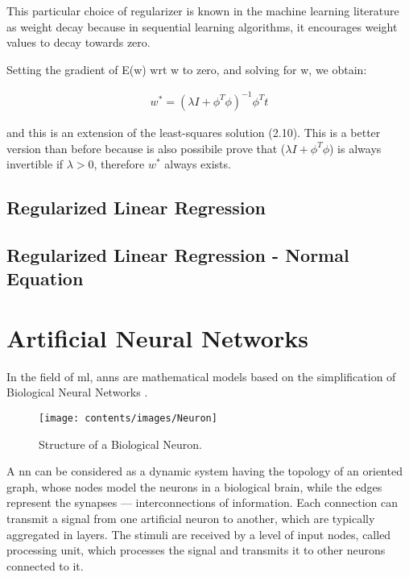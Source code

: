 \noindent This particular choice of regularizer is known in the machine learning literature as
weight decay because in sequential learning algorithms, it encourages weight values
to decay towards zero.

\noindent Setting the gradient of E(w) wrt w to zero, and solving for w, we obtain:

\begin{Equation}[H]
	\centering
		\begin{equation}
			\begin{aligned}
				w^* = (\lambda I + \phi^T \phi)^{-1} \phi^T t
			\end{aligned}
		\end{equation}
	\label{eq:mathmodelaada}
\end{Equation}

\noindent and this is an extension of the least-squares solution (2.10). This is a better version than before because is also possibile prove that ($\lambda I + \phi^T \phi$) is always invertible if $\lambda > 0$, therefore $w^*$ always exists.

\subsection{Regularized Linear Regression}
\label{subsec:regllinregr}

\subsection{Regularized Linear Regression - Normal Equation}
\label{subsec:regllinregrnormeq}

\iffalse

\section{Artificial Neural Networks}
\label{sec:nn}
In the field of \gls{ml}, \glspl{ann} are mathematical models based on the 
simplification of Biological Neural Networks \cite[][]{zou2008overview}. 

\begin{figure}[htb]
	\centering
	\texttt{[image: contents/images/Neuron]}
	\caption{Structure of a Biological Neuron.}
	\label{fig:bioneuron}
\end{figure}

A \gls{nn} can be considered as a dynamic system having the topology of an 
oriented graph, whose nodes model the neurons in a biological brain, while the 
edges represent the synapses — interconnections of information.
Each connection can transmit a signal from one artificial neuron to another,
which are typically aggregated in layers. The stimuli are received by a level of 
input nodes, called processing unit, which processes the signal and transmits it to 
other neurons connected to it.

